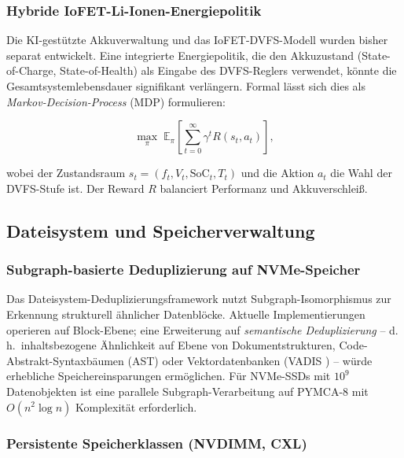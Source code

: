 ﻿\documentclass[a4paper,12pt]{scrreprt}
\theoremstyle{definition}
\begin{document}
	\subsubsection{Hybride IoFET-Li-Ionen-Energiepolitik}
	
	Die KI-gestützte Akkuverwaltung \cite{Epp2026liionp} und das
	IoFET-DVFS-Modell \cite{Epp2026iono} wurden bisher separat entwickelt.
	Eine integrierte Energiepolitik, die den Akkuzustand (State-of-Charge,
	State-of-Health) als Eingabe des DVFS-Reglers verwendet, könnte
	die Gesamtsystemlebensdauer signifikant verlängern. Formal lässt sich
	dies als \emph{Markov-Decision-Process} (MDP) formulieren:
	
	\[
	\max_\pi\; \mathbb{E}_\pi\!\left[\sum_{t=0}^{\infty}
	\gamma^t R(s_t, a_t)\right],
	\]
	
	wobei der Zustandsraum $s_t = (f_t, V_t, \mathrm{SoC}_t, T_t)$
	und die Aktion $a_t$ die Wahl der DVFS-Stufe ist.
	Der Reward $R$ balanciert Performanz und Akkuverschleiß.
	
	\subsection{Dateisystem und Speicherverwaltung}
	
	\subsubsection{Subgraph-basierte Deduplizierung auf NVMe-Speicher}
	
	Das Dateisystem-Deduplizierungsframework \cite{Epp2026dusgraph} nutzt
	Subgraph-Isomorphismus zur Erkennung strukturell ähnlicher Datenblöcke.
	Aktuelle Implementierungen operieren auf Block-Ebene; eine Erweiterung
	auf \emph{semantische Deduplizierung} -- d.\,h.\ inhaltsbezogene Ähnlichkeit
	auf Ebene von Dokumentstrukturen, Code-Abstrakt-Syntaxbäumen (AST) oder
	Vektordatenbanken (VADIS \cite{Epp2026vadis}) -- würde erhebliche
	Speichereinsparungen ermöglichen. Für NVMe-SSDs mit $10^9$ Datenobjekten
	ist eine parallele Subgraph-Verarbeitung auf PYMCA-8 mit $O(n^2\log n)$
	Komplexität erforderlich.
	
	\subsubsection{Persistente Speicherklassen (NVDIMM, CXL)}
	
\end{document}
